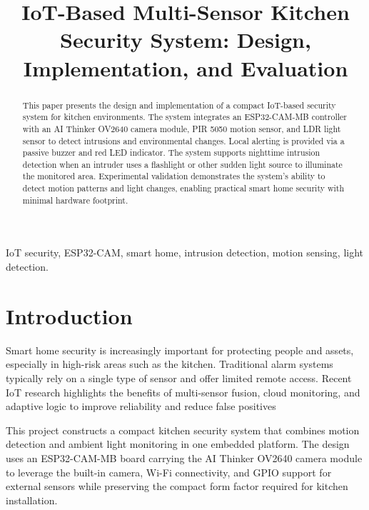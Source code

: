 \documentclass[conference]{IEEEtran}
\begin{document}
\title{IoT-Based Multi-Sensor Kitchen Security System: Design, Implementation, and Evaluation}

\author{
}

\maketitle

\begin{abstract}
This paper presents the design and implementation of a compact IoT-based security system for kitchen environments. The system integrates an ESP32-CAM-MB controller with an AI Thinker OV2640 camera module, PIR 5050 motion sensor, and LDR light sensor to detect intrusions and environmental changes. Local alerting is provided via a passive buzzer and red LED indicator. The system supports nighttime intrusion detection when an intruder uses a flashlight or other sudden light source to illuminate the monitored area. Experimental validation demonstrates the system's ability to detect motion patterns and light changes, enabling practical smart home security with minimal hardware footprint.
\end{abstract}

\begin{IEEEkeywords}
IoT security, ESP32-CAM, smart home, intrusion detection, motion sensing, light detection.
\end{IEEEkeywords}

\section{Introduction}
Smart home security is increasingly important for protecting people and assets, especially in high-risk areas such as the kitchen. Traditional alarm systems typically rely on a single type of sensor and offer limited remote access. Recent IoT research highlights the benefits of multi-sensor fusion, cloud monitoring, and adaptive logic to improve reliability and reduce false positives %

This project constructs a compact kitchen security system that combines motion detection and ambient light monitoring in one embedded platform. The design uses an ESP32-CAM-MB board carrying the AI Thinker OV2640 camera module to leverage the built-in camera, Wi-Fi connectivity, and GPIO support for external sensors while preserving the compact form factor required for kitchen installation.
\end{document}
